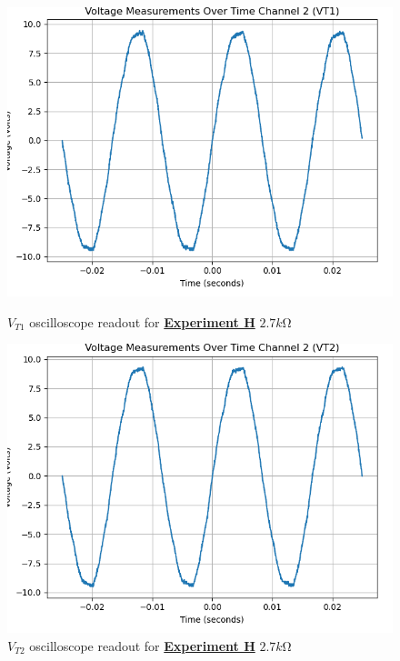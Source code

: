 \documentclass[
	letterpaper
	12pt
]{template}
\newcommand{\bref}[2]{\textbf{\hyperref[#1]{#2}}}
\begin{document}
\begin{figure}[H]\label{data::H6}
	\centering
	\begin{minipage}[c]{0.45\textwidth}
		\centering
		\includegraphics[width=\textwidth]{figures/H/11--ch2.png}
	    \caption{$V_{T1}$ oscilloscope readout for \bref{exp::H}{Experiment H} $2.7\unit{k\ohm}$ }
	\end{minipage}
	\hfill
	\begin{minipage}[c]{0.45\textwidth}
		\centering
		\includegraphics[width=\textwidth]{figures/H/12--ch2.png}
	    \caption{$V_{T2}$ oscilloscope readout for \bref{exp::H}{Experiment H} $2.7\unit{k\ohm}$ }
	\end{minipage}
\end{figure}


\end{document}

